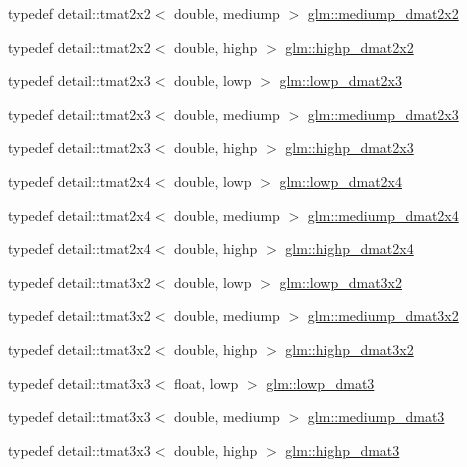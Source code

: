 \begin{DoxyCompactItemize}
\item 
typedef detail\+::tmat2x2$<$ double, mediump $>$ \hyperlink{group__core__precision_ga88ddb4188060ab00fee67c9840f4417e}{glm\+::mediump\+\_\+dmat2x2}
\item 
typedef detail\+::tmat2x2$<$ double, highp $>$ \hyperlink{group__core__precision_gaa5e35f6570d394c1cd34f411a473220c}{glm\+::highp\+\_\+dmat2x2}
\item 
typedef detail\+::tmat2x3$<$ double, lowp $>$ \hyperlink{group__core__precision_ga2c7432984a35cf72050870a54485ef35}{glm\+::lowp\+\_\+dmat2x3}
\item 
typedef detail\+::tmat2x3$<$ double, mediump $>$ \hyperlink{group__core__precision_ga734e988edf759c7012c443014acb6674}{glm\+::mediump\+\_\+dmat2x3}
\item 
typedef detail\+::tmat2x3$<$ double, highp $>$ \hyperlink{group__core__precision_gafec7367665f006f2a7643103c5eddc38}{glm\+::highp\+\_\+dmat2x3}
\item 
typedef detail\+::tmat2x4$<$ double, lowp $>$ \hyperlink{group__core__precision_gac2285cef559b0dc35cb9a7f22e6a2dd8}{glm\+::lowp\+\_\+dmat2x4}
\item 
typedef detail\+::tmat2x4$<$ double, mediump $>$ \hyperlink{group__core__precision_gadb60bf60ef2b8da4a28a372b2bcca3a3}{glm\+::mediump\+\_\+dmat2x4}
\item 
typedef detail\+::tmat2x4$<$ double, highp $>$ \hyperlink{group__core__precision_gacd51d8188f7d66a83c035b8c4cd69f2d}{glm\+::highp\+\_\+dmat2x4}
\item 
typedef detail\+::tmat3x2$<$ double, lowp $>$ \hyperlink{group__core__precision_ga678c21e4fadeda255cfb146d40844bdd}{glm\+::lowp\+\_\+dmat3x2}
\item 
typedef detail\+::tmat3x2$<$ double, mediump $>$ \hyperlink{group__core__precision_gaff0060984716bcda68ff69ed27536bf6}{glm\+::mediump\+\_\+dmat3x2}
\item 
typedef detail\+::tmat3x2$<$ double, highp $>$ \hyperlink{group__core__precision_gac956fe6b946f0ccee78367ccd5427351}{glm\+::highp\+\_\+dmat3x2}
\item 
typedef detail\+::tmat3x3$<$ float, lowp $>$ \hyperlink{group__core__precision_ga07d9423bdde2d7ff880d6ece01dc9e32}{glm\+::lowp\+\_\+dmat3}
\item 
typedef detail\+::tmat3x3$<$ double, mediump $>$ \hyperlink{group__core__precision_ga80600af2c1ca11ead6123777185c372d}{glm\+::mediump\+\_\+dmat3}
\item 
typedef detail\+::tmat3x3$<$ double, highp $>$ \hyperlink{group__core__precision_ga993461e1d2caf19abd4f64d02ccdafa9}{glm\+::highp\+\_\+dmat3}

\end{DoxyCompactItemize}
